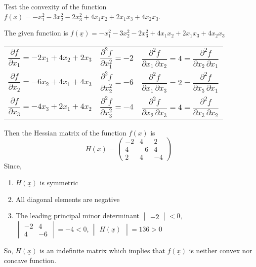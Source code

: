 \documentclass[../main-sheet.tex]{subfiles}
\begin{document}
\begin{prob}
    Test the convexity of the function \(f(\underline{x})=-x_1^2-3x_2^2-2x_3^2+4x_1x_2+2x_1x_3+4x_2x_3\).
\end{prob}
\begin{soln}
    The given function is \(f(\underline{x})=-x_1^2-3x_2^2-2x_3^2+4x_1x_2+2x_1x_3+4x_2x_3\)
    \begin{table}[H]
        \centering
        \begin{tabular}{l@{\quad}|@{\quad}l@{\quad}|@{\quad}l}
            \(\dfrac{\partial f}{\partial x_1}=-2x_1+4x_2+2x_3\)&\(\dfrac{\partial^2 f}{\partial x_1^2}=-2\)&\(\dfrac{\partial^2 f}{\partial x_1\,\partial x_2}=4=\dfrac{\partial^2 f}{\partial x_2\,\partial x_1}\)\\[2.5ex]
            \(\dfrac{\partial f}{\partial x_2}=-6x_2+4x_1+4x_3\)&\(\dfrac{\partial^2 f}{\partial x_2^2}=-6\)&\(\dfrac{\partial^2 f}{\partial x_1\,\partial x_3}=2=\dfrac{\partial^2 f}{\partial x_3\,\partial x_1}\)\\[2.5ex]
            \(\dfrac{\partial f}{\partial x_3}=-4x_3+2x_1+4x_2\)&\(\dfrac{\partial^2 f}{\partial x_3^2}=-4\)&\(\dfrac{\partial^2 f}{\partial x_2\,\partial x_3}=4=\dfrac{\partial^2 f}{\partial x_3\,\partial x_2}\)\\
        \end{tabular}
    \end{table}
    Then the Hessian matrix of the function \(f(x)\) is
    \[H(\underline{x})=\begin{pmatrix}
        -2&4&2\\
        4&-6&4\\
        2&4&-4
    \end{pmatrix}
    \]
    Since,
    \begin{enumerate}[label=(\roman*)]
        \item \(H(\underline{x})\) is symmetric
        \item All diagonal elements are negative
        \item The leading principal minor determinant \(\begin{vmatrix}
            -2
        \end{vmatrix}<0\), \(\begin{vmatrix}
            -2 &4\\
            4&-6
        \end{vmatrix}=-4<0\), \(\begin{vmatrix}
            H(\underline{x})
        \end{vmatrix}=136>0\)
    \end{enumerate}
    So, \(H(\underline{x})\) is an indefinite matrix which implies that \(f(\underline{x})\) is neither convex nor concave function.
\end{soln}
\end{document}
